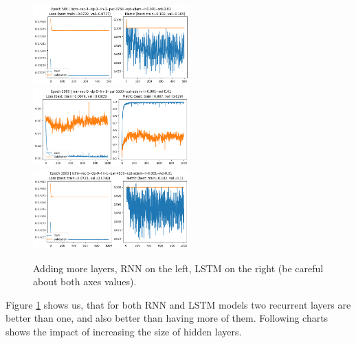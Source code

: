 \documentclass[a4paper,10pt]{article}
\begin{document}
\begin{figure}[H]
\begin{center}
            \includegraphics[width=6cm]{figures/lstm--rec-4--dp-0--lin-1--par-3750--opt-adam--lr-0.001--wd-0.01--e-500.png}
            \includegraphics[width=6cm]{figures/rnn--rec-5--dp-0--lin-1--par-5530--opt-adam--lr-0.001--wd-0.01--e-1000.png}
            \includegraphics[width=6cm]{figures/lstm--rec-5--dp-0--lin-1--par-4630--opt-adam--lr-0.001--wd-0.01--e-1000.png}
      \end{center}
      \caption{Adding more layers, RNN on the left, LSTM on the right (be careful about both axes values).}
      \label{fig6}
\end{figure}

Figure \ref{fig6} shows us, that for both RNN and LSTM models two recurrent layers are better than one, and also better than having more of them.
Following charts shows the impact of increasing the size of hidden layers.
\end{document}
